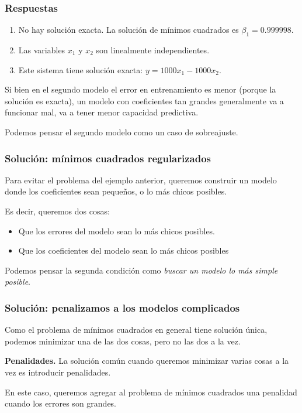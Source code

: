 \documentclass[aspectratio=169,12pt]{beamer}
\begin{document}
\begin{frame}
\frametitle{Respuestas}

\begin{enumerate}
\item No hay solución exacta. La solución de mínimos cuadrados es $\beta_1 = 0.999998$.
\item Las variables $x_1$ y $x_2$ son linealmente independientes.
\item Este sistema tiene solución exacta: $y = 1000 x_1 - 1000 x_2$.
\end{enumerate}

Si bien en el segundo modelo el error en entrenamiento es menor (porque la solución es exacta), un modelo con coeficientes tan grandes generalmente va a funcionar mal, va a tener menor capacidad predictiva.

Podemos pensar el segundo modelo como un caso de sobreajuste.
\end{frame}


\begin{frame}
\frametitle{Solución: mínimos cuadrados regularizados}

Para evitar el problema del ejemplo anterior, queremos construir un modelo donde los coeficientes sean pequeños, o lo más chicos posibles.

Es decir, queremos dos cosas:
\begin{itemize}
\item Que los errores del modelo sean lo más chicos posibles.
\item Que los coeficientes del modelo sean lo más chicos posibles
\end{itemize}

Podemos pensar la segunda condición como \emph{buscar un modelo lo más simple posible}.

\end{frame}



\begin{frame}
\frametitle{Solución: penalizamos a los modelos complicados}

Como el problema de mínimos cuadrados en general tiene solución única, podemos minimizar una de las dos cosas, pero no las dos a la vez.

\textbf{Penalidades.} La solución común cuando queremos minimizar varias cosas a la vez es introducir penalidades.

En este caso, queremos agregar al problema de mínimos cuadrados una penalidad cuando los errores son grandes.

\end{frame}
\end{document}
